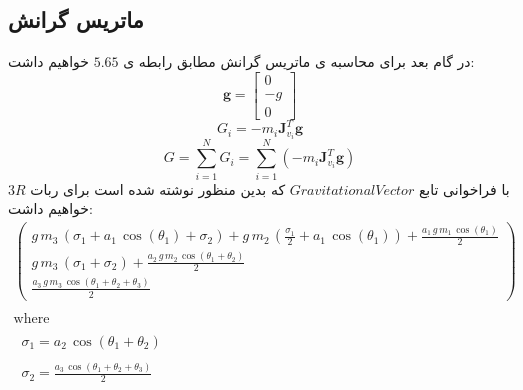 \subsection*{ماتریس گرانش}
در گام بعد برای محاسبه ی ماتریس گرانش مطابق رابطه ی $5.65$ خواهیم داشت:
\[
\mathbf{g} = \begin{bmatrix} 0 \\ -g \\ 0 \end{bmatrix}
\]
\[
G_i = -m_i \mathbf{J}_{v_i}^T \mathbf{g}
\]
\[
G = \sum_{i=1}^{N} G_i = \sum_{i=1}^{N} \left( -m_i \mathbf{J}_{v_i}^T \mathbf{g} \right)
\]
با فراخوانی تابع
 $GravitationalVector$
  که بدین منظور نوشته شده است برای ربات $3R$ خواهیم داشت:
\[
\begin{array}{l}
	\left(\begin{array}{c}
		g\,m_3 \,{\left(\sigma_1 +a_1 \,\cos \left(\theta_1 \right)+\sigma_2 \right)}+g\,m_2 \,{\left(\frac{\sigma_1 }{2}+a_1 \,\cos \left(\theta_1 \right)\right)}+\frac{a_1 \,g\,m_1 \,\cos \left(\theta_1 \right)}{2}\\
		g\,m_3 \,{\left(\sigma_1 +\sigma_2 \right)}+\frac{a_2 \,g\,m_2 \,\cos \left(\theta_1 +\theta_2 \right)}{2}\\
		\frac{a_3 \,g\,m_3 \,\cos \left(\theta_1 +\theta_2 +\theta_3 \right)}{2}
	\end{array}\right)\\
	\mathrm{}\\
	\textrm{where}\\
	\mathrm{}\\
	\;\;\sigma_1 =a_2 \,\cos \left(\theta_1 +\theta_2 \right)\\
	\mathrm{}\\
	\;\;\sigma_2 =\frac{a_3 \,\cos \left(\theta_1 +\theta_2 +\theta_3 \right)}{2}
\end{array}
\]
